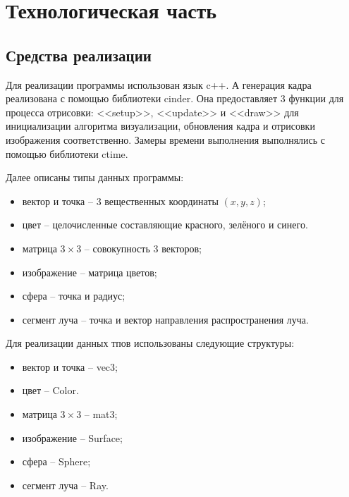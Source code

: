 \chapter{Технологическая часть}
\section {Средства реализации} {
    Для реализации программы использован язык c++.
    А генерация кадра реализована с помощью библиотеки cinder.
    Она предоставляет 3 функции для процесса отрисовки:
    <<setup>>, <<update>> и <<draw>> для инициализации алгоритма визуализации,
    обновления кадра и отрисовки изображения соответственно.
    Замеры времени выполнения выполнялись с помощью библиотеки ctime.
    
    Далее описаны типы данных программы:
    \begin{itemize}
        \item вектор и точка -- 3 вещественных координаты $(x, y, z)$;
        \item цвет -- целочисленные составляющие красного, зелёного и синего.
        \item матрица $3 \times 3$ -- совокупность 3 векторов;
        \item изображение -- матрица цветов;
        \item сфера -- точка и радиус;
        \item сегмент луча -- точка и вектор направления распространения луча.
    \end{itemize}
    
    Для реализации данных тпов использованы следующие структуры:
    \begin{itemize}
        \item вектор и точка -- vec3;
        \item цвет -- Color.
        \item матрица $3 \times 3$ -- mat3;
        \item изображение -- Surface;
        \item сфера -- Sphere;
        \item сегмент луча -- Ray.
    \end{itemize}
}

